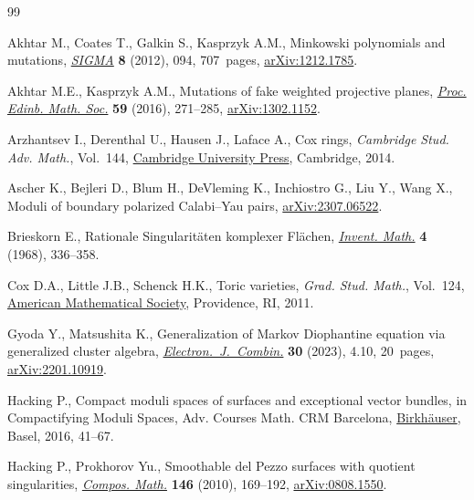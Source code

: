 \begin{thebibliography}{99}
\footnotesize\itemsep=0pt

Akhtar M., Coates T., Galkin S., Kasprzyk A.M., Minkowski polynomials and
 mutations, \href{https://doi.org/10.3842/SIGMA.2012.094}{\textit{SIGMA}}
 \textbf{8} (2012), 094, 707~pages,
 \href{http://arxiv.org/abs/1212.1785}{arXiv:1212.1785}.

Akhtar M.E., Kasprzyk A.M., Mutations of fake weighted projective planes,
 \href{https://doi.org/10.1017/S0013091515000115}{\textit{Proc. Edinb. Math.
 Soc.}} \textbf{59} (2016), 271--285,
 \href{http://arxiv.org/abs/1302.1152}{arXiv:1302.1152}.

Arzhantsev I., Derenthal U., Hausen J., Laface A., Cox rings, \textit{Cambridge
 Stud. Adv. Math.}, Vol.~144,
 \href{https://doi.org/10.1017/CBO9781139175852}{Cambridge University Press}, Cambridge, 2014.

Ascher K., Bejleri D., Blum H., DeVleming K., Inchiostro G., Liu Y., Wang X.,
 Moduli of boundary polarized {C}alabi--{Y}au pairs,
 \href{http://arxiv.org/abs/2307.06522}{arXiv:2307.06522}.

Brieskorn E., Rationale {S}ingularit\"aten komplexer {F}l\"achen,
 \href{https://doi.org/10.1007/BF01425318}{\textit{Invent. Math.}} \textbf{4}
 (1968), 336--358.

Cox D.A., Little J.B., Schenck H.K., Toric varieties, \textit{Grad. Stud.
 Math.}, Vol.~124, \href{https://doi.org/10.1090/gsm/124}{American
 Mathematical Society}, Providence, RI, 2011.

Gyoda Y., Matsushita K., Generalization of {M}arkov {D}iophantine equation via
 generalized cluster algebra,
 \href{https://doi.org/10.37236/11420}{\textit{Electron.~J.~Combin.}}
 \textbf{30} (2023), 4.10, 20~pages,
 \href{http://arxiv.org/abs/2201.10919}{arXiv:2201.10919}.

Hacking P., Compact moduli spaces of surfaces and exceptional vector bundles,
 in Compactifying Moduli Spaces, Adv. Courses Math. CRM Barcelona,
 \href{https://doi.org/10.1007/978-3-0348-0921-4_2}{Birkh\"auser}, Basel,
 2016, 41--67.

Hacking P., Prokhorov Yu., Smoothable del {P}ezzo surfaces with quotient
 singularities,
 \href{https://doi.org/10.1112/S0010437X09004370}{\textit{Compos. Math.}}
 \textbf{146} (2010), 169--192,
 \href{http://arxiv.org/abs/0808.1550}{arXiv:0808.1550}.


\end{thebibliography}
